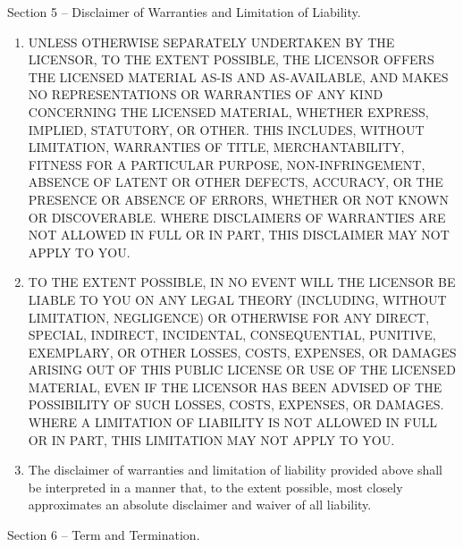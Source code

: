\documentclass[
]{scrbook}
\begin{document}
Section 5 -- Disclaimer of Warranties and Limitation of Liability.

\begin{enumerate}
\def\labelenumi{\alph{enumi}.}
\item
  UNLESS OTHERWISE SEPARATELY UNDERTAKEN BY THE LICENSOR, TO THE EXTENT
  POSSIBLE, THE LICENSOR OFFERS THE LICENSED MATERIAL AS-IS AND
  AS-AVAILABLE, AND MAKES NO REPRESENTATIONS OR WARRANTIES OF ANY KIND
  CONCERNING THE LICENSED MATERIAL, WHETHER EXPRESS, IMPLIED, STATUTORY,
  OR OTHER. THIS INCLUDES, WITHOUT LIMITATION, WARRANTIES OF TITLE,
  MERCHANTABILITY, FITNESS FOR A PARTICULAR PURPOSE, NON-INFRINGEMENT,
  ABSENCE OF LATENT OR OTHER DEFECTS, ACCURACY, OR THE PRESENCE OR
  ABSENCE OF ERRORS, WHETHER OR NOT KNOWN OR DISCOVERABLE. WHERE
  DISCLAIMERS OF WARRANTIES ARE NOT ALLOWED IN FULL OR IN PART, THIS
  DISCLAIMER MAY NOT APPLY TO YOU.
\item
  TO THE EXTENT POSSIBLE, IN NO EVENT WILL THE LICENSOR BE LIABLE TO YOU
  ON ANY LEGAL THEORY (INCLUDING, WITHOUT LIMITATION, NEGLIGENCE) OR
  OTHERWISE FOR ANY DIRECT, SPECIAL, INDIRECT, INCIDENTAL,
  CONSEQUENTIAL, PUNITIVE, EXEMPLARY, OR OTHER LOSSES, COSTS, EXPENSES,
  OR DAMAGES ARISING OUT OF THIS PUBLIC LICENSE OR USE OF THE LICENSED
  MATERIAL, EVEN IF THE LICENSOR HAS BEEN ADVISED OF THE POSSIBILITY OF
  SUCH LOSSES, COSTS, EXPENSES, OR DAMAGES. WHERE A LIMITATION OF
  LIABILITY IS NOT ALLOWED IN FULL OR IN PART, THIS LIMITATION MAY NOT
  APPLY TO YOU.
\item
  The disclaimer of warranties and limitation of liability provided
  above shall be interpreted in a manner that, to the extent possible,
  most closely approximates an absolute disclaimer and waiver of all
  liability.
\end{enumerate}

Section 6 -- Term and Termination.
\end{document}
